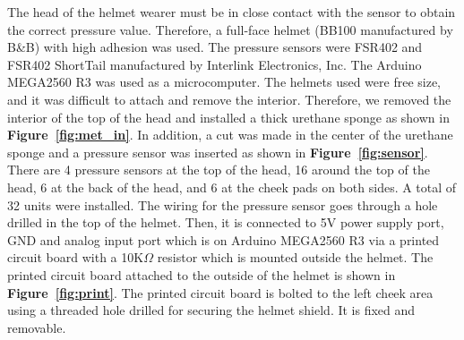 \documentclass[sigchi,authordraft]{acmart}
\newcommand\figref[1]{\textbf{Figure~\ref{fig:#1}}}
\begin{document}
The head of the helmet wearer must be in close contact with the sensor to obtain the correct pressure value. Therefore, a full-face helmet (BB100 manufactured by B\&B) with high adhesion was used. The pressure sensors were FSR402 and FSR402 ShortTail manufactured by Interlink Electronics, Inc. The Arduino MEGA2560 R3 was used as a microcomputer. The helmets used were free size, and it was difficult to attach and remove the interior. Therefore, we removed the interior of the top of the head and installed a thick urethane sponge as shown in \figref{met_in}. In addition, a cut was made in the center of the urethane sponge and a pressure sensor was inserted as shown in \figref{sensor}. There are 4 pressure sensors at the top of the head, 16 around the top of the head, 6 at the back of the head, and 6 at the cheek pads on both sides. A total of 32 units were installed. The wiring for the pressure sensor goes through a hole drilled in the top of the helmet. Then, it is connected to 5V power supply port, GND and analog input port which is on Arduino MEGA2560 R3 via a printed circuit board with a 10K$\Omega$ resistor which is mounted outside the helmet. The printed circuit board attached to the outside of the helmet is shown in \figref{print}. The printed circuit board is bolted to the left cheek area using a threaded hole drilled for securing the helmet shield. It is fixed and removable.

\end{document}
